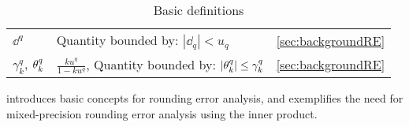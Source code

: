 \begin{table}[h!]
\begin{tabular}{|m{3cm}|m{9cm}|c|}
		$\dd^{q}$ &Quantity bounded by: $|\dd_{q}| < u_q$ &  \ref{sec:backgroundRE} \\
		$\gamma^{q}_{k}$,  $\theta^{q}_{k}$& $\frac{ku^q}{1-ku^q}$, Quantity bounded by: $|\theta^{q}_{k}|\leq\gamma^q_{k}$ &  \ref{sec:backgroundRE} \\
		\hline
		\hline		
		\hline
	\end{tabular}
	\caption{Basic definitions}
	\label{table:notation}
\end{table}
 introduces basic concepts for rounding error analysis, and  exemplifies the need for mixed-precision rounding error analysis using the inner product.
